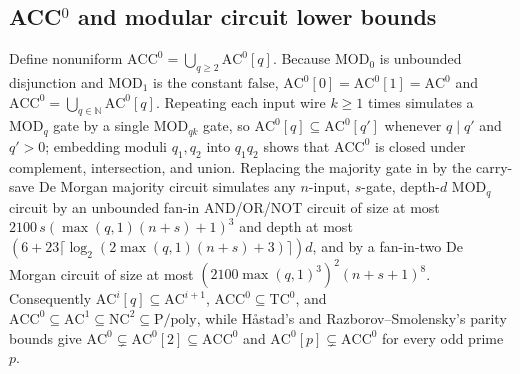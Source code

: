 \begin{result}
\subsection{\texorpdfstring{ACC$^0$}{ACC\^0} and modular circuit lower bounds}
Define nonuniform $\mathrm{ACC}^0=\bigcup_{q\ge 2}\mathrm{AC}^0[q]$. Because
$\mathrm{MOD}_0$ is unbounded disjunction and $\mathrm{MOD}_1$ is the constant
$\mathrm{false}$, $\mathrm{AC}^0[0]=\mathrm{AC}^0[1]=\mathrm{AC}^0$ and
$\mathrm{ACC}^0=\bigcup_{q\in\mathbb N}\mathrm{AC}^0[q]$. Repeating each input
wire $k\ge 1$ times simulates a $\mathrm{MOD}_q$ gate by a single
$\mathrm{MOD}_{qk}$ gate, so $\mathrm{AC}^0[q]\subseteq\mathrm{AC}^0[q']$
whenever $q\mid q'$ and $q'>0$; embedding moduli $q_1,q_2$ into $q_1q_2$ shows
that $\mathrm{ACC}^0$ is closed under complement, intersection, and union.
Replacing the majority gate in  by the carry-save
De Morgan majority circuit simulates any $n$-input, $s$-gate, depth-$d$
$\mathrm{MOD}_q$ circuit by an unbounded fan-in AND/OR/NOT circuit of size at
most $2100\,s(\max(q,1)(n+s)+1)^3$ and depth at most
$(6+23\lceil\log_2(2\max(q,1)(n+s)+3)\rceil)d$, and by a fan-in-two De Morgan
circuit of size at most $(2100\max(q,1)^3)^2(n+s+1)^8$. Consequently
$\mathrm{AC}^i[q]\subseteq\mathrm{AC}^{i+1}$,
$\mathrm{ACC}^0\subseteq\mathrm{TC}^0$, and
$\mathrm{ACC}^0\subseteq\mathrm{AC}^1\subseteq\mathrm{NC}^2\subseteq\mathrm{P/poly}$,
while H\aa stad's and Razborov--Smolensky's parity bounds give
$\mathrm{AC}^0\subsetneq\mathrm{AC}^0[2]\subseteq\mathrm{ACC}^0$ and
$\mathrm{AC}^0[p]\subsetneq\mathrm{ACC}^0$ for every odd prime $p$.


\end{result}
